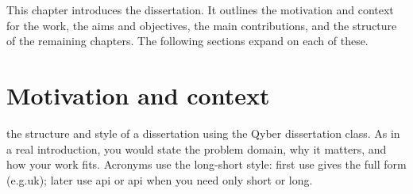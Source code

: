 %

This chapter introduces the dissertation. It outlines the motivation and context for the work, the aims and objectives, the main contributions, and the structure of the remaining chapters. The following sections expand on each of these.



\section{Motivation and context}\label{sec:motivation}

 the structure and style of a dissertation using the Qyber dissertation class. As in a real introduction, you would state the problem domain, why it matters, and how your work fits. Acronyms use the long-short style: first use gives the full form (e.g.\@ \gls{uk}); later use \acrshort{api} or \acrlong{api} when you need only short or long.

